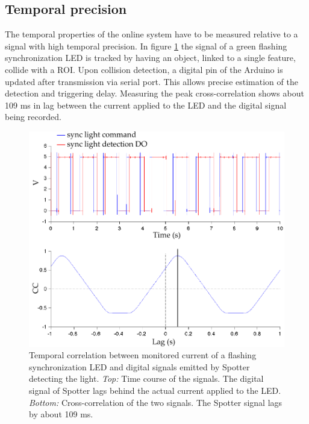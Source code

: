\subsection{Temporal precision}
\label{sec:TemporalPrecision}

The temporal properties of the online system have to be measured relative to a signal with high temporal precision. In figure \ref{fig:temporal} the signal of a green flashing synchronization LED is tracked by having an object, linked to a single feature, collide with a ROI. Upon collision detection, a digital pin of the Arduino is updated after transmission via serial port. This allows precise estimation of the detection and triggering delay. Measuring the peak cross-correlation shows about 109 ms in lag between the current applied to the LED and the digital signal being recorded.

\begin{figure}[H] %
	\centering
		\includegraphics [width=\linewidth]{gfx/temporal.pdf} %
	\caption[Test]{Temporal correlation between monitored current of a flashing synchronization LED and digital signals emitted by Spotter detecting the light. \emph{Top:} Time course of the signals. The digital signal of Spotter lags behind the actual current applied to the LED. \emph{Bottom:} Cross-correlation of the two signals. The Spotter signal lags by about 109 ms.}
	\label{fig:temporal}
\end{figure}

\newpage
